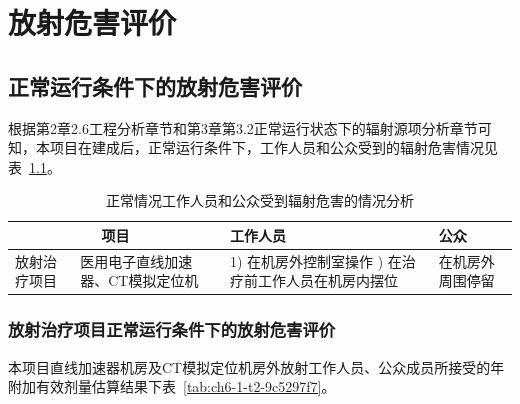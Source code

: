 \chapter{放射危害评价}

\section{正常运行条件下的放射危害评价}

根据第2章2.6工程分析章节和第3章第3.2正常运行状态下的辐射源项分析章节可知，本项目在建成后，正常运行条件下，工作人员和公众受到的辐射危害情况见表~\ref{tab:ch6-1-t1-a18f249f}。


\begin{table}[H]
\centering
\caption{正常情况工作人员和公众受到辐射危害的情况分析}
\label{tab:ch6-1-t1-a18f249f}
\begin{tabular}{|p{2.5cm}|p{2.5cm}|p{6cm}|p{2.5cm}|}
\hline
\multicolumn{2}{|c|}{项目} & 工作人员 & 公众 \\
\hline
放射治疗项目 & 医用电子直线加速器、CT模拟定位机 & 
1) 在机房外控制室操作 \newline
2) 在治疗前工作人员在机房内摆位 & 
在机房外周围停留 \\
\hline
\end{tabular}
\end{table}


\subsection{放射治疗项目正常运行条件下的放射危害评价}

本项目直线加速器机房及CT模拟定位机房外放射工作人员、公众成员所接受的年附加有效剂量估算结果下表~\ref{tab:ch6-1-t2-9c5297f7}。


